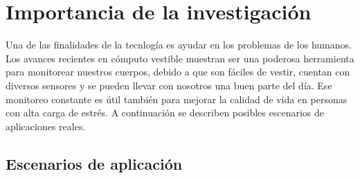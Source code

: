 \documentclass[letterpaper,12pt]{cicese}
\begin{document}
		\chapter{Importancia de la investigaci\'on}
				Una de las finalidades de la tecnlog\'ia es ayudar en los problemas de los humanos. Los avances recientes en c\'omputo vestible muestran
				ser una poderosa herramienta para monitorear nuestros cuerpos, debido a que son f\'aciles de vestir, cuentan con diversos sensores y se pueden
				llevar con nosotros una buen parte del d\'ia. Ese monitoreo constante es \'util tambi\'en para mejorar la calidad de vida en personas con alta
				carga de estr\'es. A continuaci\'on se describen posibles escenarios de aplicaciones reales.
				
				\section{Escenarios de aplicaci\'on}
\end{document}
